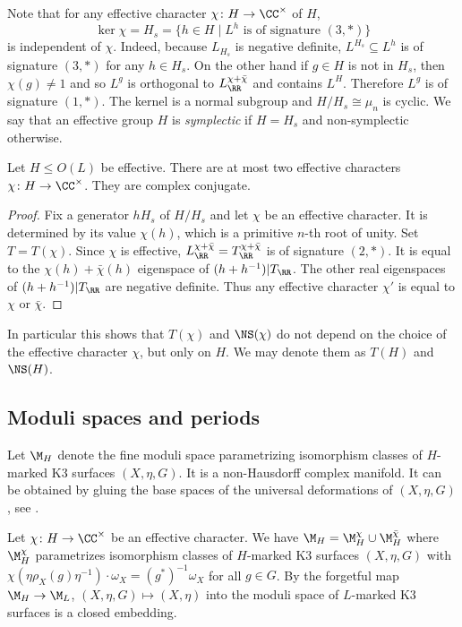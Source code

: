 Note that for any effective character $\chi\colon H \to \CC^\times$ of $H$,
\[\ker \chi = H_s = \{h \in H \mid L^h \mbox{ is of signature } (3,*)\}\]
is independent of $\chi$. Indeed, because $L_{H_s}$ is negative definite, $L^{H_s}\subseteq L^h$ is of signature $(3,*)$ for any $h \in H_s$. On the other hand if $g\in H$ is not in $H_s$, then $\chi(g)\neq 1$ and so $L^g$ is orthogonal to $L_\RR^{\chi+\bar \chi}$ and contains $L^H$. Therefore $L^g$ is of signature $(1,*)$.
The kernel is a normal subgroup and $H/H_s \cong \mu_n$ is cyclic. We say that an effective group $H$ is \emph{symplectic} if $H=H_s$ and non-symplectic otherwise.

\begin{lemma}
 Let $H \leq O(L)$ be effective. There are at most two effective characters $\chi \colon H \to \CC^\times$. They are complex conjugate.
\end{lemma}
\begin{proof}
  Fix a generator $h H_s$ of $H/H_s$ and let $\chi$ be an effective character. It is determined by its value $\chi(h)$, which is a primitive $n$-th root of unity. Set $T=T(\chi)$.
Since $\chi$ is effective,
$L_\RR^{\chi +\bar \chi}= T_\RR^{\chi +\bar \chi}$ is of signature $(2,*)$.
It is equal to the $\chi(h)+\bar \chi(h)$ eigenspace of $(h+h^{-1})|T_\RR$. The other real eigenspaces of $(h+h^{-1})|T_\RR$ are negative definite. Thus any effective character $\chi'$ is equal to $\chi$ or $\bar \chi$.
\end{proof}
In particular this shows that $T(\chi)$ and $\NS(\chi)$ do not depend on the choice of the effective character $\chi$, but only on $H$. We may denote them as $T(H)$ and $\NS(H)$.
\subsection{Moduli spaces and periods}
Let $\M_H$ denote the fine moduli space parametrizing isomorphism classes of $H$-marked K3 surfaces $(X,\eta,G)$. It is a non-Hausdorff complex manifold.
It can be obtained by gluing the base spaces of the universal deformations of $(X,\eta,G)$, see \cite[\S 3]{brandhorst-cattaneo}.

Let $\chi\colon H \to \CC^\times$ be an effective character. We have $\M_H = \M^\chi_H \cup \M^{\bar\chi}_H$ where $\M_H^\chi$ parametrizes isomorphism classes of $H$-marked K3 surfaces $(X,\eta, G)$ with $\chi(\eta \rho_X(g)\eta^{-1}) \cdot \omega_X = (g^*)^{-1} \omega_X$ for all $g \in G$.
By \cite[Prop. 3.9]{brandhorst-cattaneo} the forgetful map $\M_H \to \M_L$, $(X,\eta,G) \mapsto (X,\eta)$ into the moduli space of $L$-marked K3 surfaces is a closed embedding.

